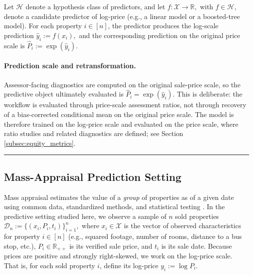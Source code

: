 \documentclass[12pt, draft]{article}
\theoremstyle{plain}
\theoremstyle{definition}
\newcommand{\1}{\mathbf{1}}
\begin{document}
{Let $\mathcal{H}$ denote a hypothesis class of predictors, and let
$
f:\mathcal{X}\to\mathbb{R},$ with  
$
f\in\mathcal{H},
$
denote a candidate predictor of log-price (e.g., a linear model or a boosted-tree model). For each property $i\in[n]$, the predictor produces the log-scale prediction
$
\hat y_i := f(x_i),
$
and the corresponding prediction on the original price scale is
$
\widehat P_i := \exp(\hat y_i).
$


\paragraph{Prediction scale and retransformation.}
Assessor-facing diagnostics are computed on the original sale-price scale, so the predictive object ultimately evaluated is \(\widehat P_i=\exp(\hat y_i)\). This is deliberate: the workflow is evaluated through price-scale assessment ratios, not through recovery of a bias-corrected conditional mean on the original price scale. The model is therefore trained on the log-price scale and evaluated on the price scale, where ratio studies and related diagnostics are defined; see Section \ref{subsec:equity_metrics}.

\hrule 

\subsection{Mass-Appraisal Prediction Setting}
\label{subsec:prediction_setting}

Mass appraisal estimates the value of a \emph{group} of properties as of a given date using common data, standardized methods, and statistical testing \cite{IAAO2025Mass}. In the predictive setting studied here, we observe a sample of $n$ sold properties
$
\mathcal{D}_n := \{(x_i,P_i,t_i)\}_{i=1}^n,
$
where $x_i \in \mathcal{X}$ is the vector of observed characteristics for property $i \in [n]$ (e.g., squared footage, number of rooms, distance to a bus stop, etc.), $P_i \in \mathbb{R}_{++}$ is its verified sale price, and $t_i$ is its sale date. Because prices are positive and strongly right-skewed, we work on the log-price scale. That is, for each sold property $i$, define its log-price
$
y_i := \log P_i.
$

}
\end{document}
